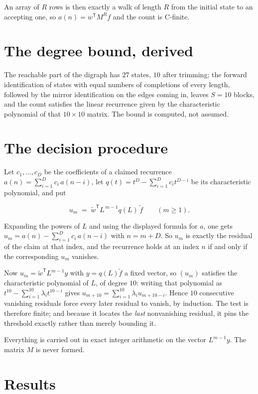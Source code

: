 \documentclass[11pt]{article}
\theoremstyle{definition}
\begin{document}
An array of $R$ rows is then exactly a walk of length $R$ from the initial state to an accepting one, so $a(n) = w^{\mathsf T}M^{R}f$ and the count is C-finite.

\section{The degree bound, derived}

The reachable part of the digraph has $27$ states, $10$ after trimming; the forward identification of states with equal numbers of completions of every length, followed by the mirror identification on the edges coming in, leaves $S = 10$ blocks, and the count satisfies the linear recurrence given by the characteristic polynomial of that $10\times10$ matrix. The bound is computed, not assumed.

\section{The decision procedure}

Let $c_1,\dots,c_D$ be the coefficients of a claimed recurrence $a(n) = \sum_{i=1}^{D} c_i\,a(n-i)$, let $q(t) = t^{D} - \sum_{i=1}^{D} c_i t^{D-i}$ be its characteristic polynomial, and put

\[u_m \;=\; \tilde w^{\mathsf T} L^{\,m-1} q(L)\,\tilde f \qquad (m \ge 1).\]

Expanding the powers of $L$ and using the displayed formula for $a$, one gets $u_m = a(n) - \sum_{i=1}^{D} c_i\,a(n-i)$ with $n = m + D$. So $u_m$ is exactly the residual of the claim at that index, and the recurrence holds at an index $n$ if and only if the corresponding $u_m$ vanishes.

Now $u_m = \tilde w^{\mathsf T} L^{m-1} y$ with $y = q(L)\tilde f$ a fixed vector, so $(u_m)$ satisfies the characteristic polynomial of $L$, of degree $10$: writing that polynomial as $t^{10} - \sum_{i=1}^{10} \lambda_i t^{10-i}$ gives $u_{m+10} = \sum_{i=1}^{10} \lambda_i u_{m+10-i}$. Hence $10$ consecutive vanishing residuals force every later residual to vanish, by induction. The test is therefore finite; and because it locates the {\itshape last} nonvanishing residual, it pins the threshold exactly rather than merely bounding it.

Everything is carried out in exact integer arithmetic on the vector $L^{m-1}y$. The matrix $M$ is never formed.

\section{Results}
\end{document}
